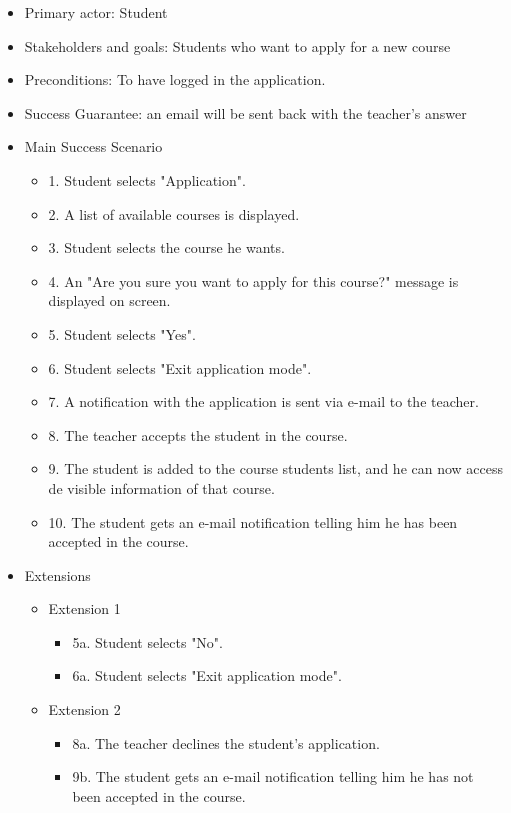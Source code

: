 \documentclass{article}
\begin{document}
\begin{enumerate}
\begin{enumerate}
\begin{enumerate}
\begin{itemize}
			
			\begin{itemize}
				\item Primary actor: Student
				\item Stakeholders and goals: Students who want to apply for a new course
				\item Preconditions: To have logged in the application.
				\item Success Guarantee: an email will be sent back with the teacher's answer
				\item Main Success Scenario
				\begin{itemize}
					\item 1. Student selects "Application".
					\item 2. A list of available courses is displayed.
					\item 3. Student selects the course he wants.
					\item 4. An "Are you sure you want to apply for this course?" message is displayed on screen.
					\item 5. Student selects "Yes".
					\item 6. Student selects "Exit application mode".
					\item 7. A notification with the application is sent via e-mail to the teacher.
					\item 8. The teacher accepts the student in the course.
					\item 9. The student is added to the course students list, and he can now access de visible information of that course.
					\item 10. The student gets an e-mail notification telling him he has been accepted in the course.
				\end{itemize}
				\item Extensions
				\begin{itemize}
					\item Extension 1
					\begin{itemize}
						\item 5a. Student selects "No".
						\item 6a. Student selects "Exit application mode".
					\end{itemize}
					\item Extension 2
					\begin{itemize}
						\item 8a. The teacher declines the student's application.
						\item 9b. The student gets an e-mail notification telling him he has not been accepted in the course.
					\end{itemize}
					

\end{itemize}
\end{itemize}
\end{itemize}
\end{enumerate}
\end{enumerate}
\end{enumerate}
\end{document}
